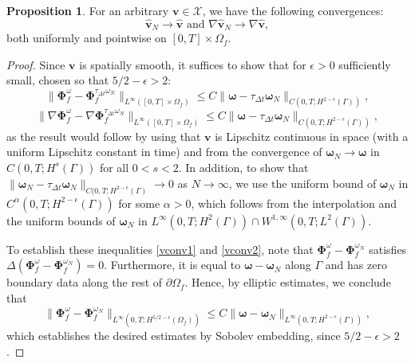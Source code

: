 \documentclass[11pt]{article}
\newcommand{\bd}{\boldsymbol}
\theoremstyle{definition}
\newtheorem{proposition}{Proposition}[section]
\begin{document}
\begin{proposition}\label{testconvergence}
For an arbitrary $\bd{v} \in \mathcal{X}$, we have the following convergences:
\begin{equation*}
\hat{\bd{v}}_{N} \to \hat{\bd{v}} \text{ and } \nabla \hat{\bd{v}}_{N} \to \nabla \hat{\bd{v}},
\end{equation*}
both uniformly and pointwise on $[0, T] \times \Omega_{f}$. 
\end{proposition}

\begin{proof}
Since $\bd{v}$ is spatially smooth, it suffices to show that for $\epsilon > 0$ sufficiently small, chosen so that $5/2 - \epsilon > 2$:
\begin{equation}\label{vconv1}
\|\bd{\Phi}^{\omega}_{f} - \bd{\Phi}^{\tau_{\Delta t}\omega_{N}}_{f}\|_{L^{\infty}([0, T] \times \Omega_{f})} \le C\|\bd{\omega} - \tau_{\Delta t}\bd{\omega}_{N}\|_{C(0, T; H^{2 - \epsilon}(\Gamma))},
\end{equation}
\begin{equation}\label{vconv2}
\|\nabla \bd{\Phi}^{\omega}_{f} - \nabla \bd{\Phi}^{\tau_{\Delta t}\omega_{N}}_{f}\|_{L^{\infty}([0, T] \times \Omega_{f})} \le C\|\bd{\omega} - \tau_{\Delta t}\bd{\omega}_{N}\|_{C(0, T; H^{2 - \epsilon}(\Gamma))},
\end{equation}
as the result would follow by using that $\bd{v}$ is Lipschitz continuous in space (with a uniform Lipschitz constant in time) and from the convergence of $\bd{\omega}_{N} \to \bd{\omega}$ in $C(0, T; H^{s}(\Gamma))$ for all $0 < s < 2$. In addition, to show that $\|\bd{\omega}_{N} - \tau_{\Delta t} \bd{\omega}_{N}\|_{C(0, T; H^{2 - \epsilon}(\Gamma)} \to 0$ as $N \to \infty$, we use the uniform bound of $\bd{\omega}_{N}$ in $C^{\alpha}(0, T; H^{2 - \epsilon}(\Gamma))$ for some $\alpha > 0$, which follows from the interpolation and the uniform bounds of $\bd{\omega}_{N}$ in $L^{\infty}(0, T; H^{2}(\Gamma)) \cap W^{1, \infty}(0, T; L^{2}(\Gamma))$. 

To establish these inequalities \eqref{vconv1} and \eqref{vconv2}, note that $\bd{\Phi}^{\omega}_{f} - \bd{\Phi}^{\omega_{N}}_{f}$ satisfies $\Delta (\bd{\Phi}^{\omega}_{f} - \bd{\Phi}^{\omega_{N}}_{f}) = 0$. Furthermore, it is equal to $\bd{\omega} - \bd{\omega}_{N}$ along $\Gamma$ and has zero boundary data along the rest of $\partial \Omega_{f}$. Hence, by elliptic estimates, we conclude that
\begin{equation*}
\|\bd{\Phi}^{\omega}_{f} - \bd{\Phi}^{\omega_{N}}_{f}\|_{L^{\infty}(0, T; H^{5/2 - \epsilon}(\Omega_{f}))} \le C\|\bd{\omega} - \bd{\omega}_{N}\|_{L^{\infty}(0, T; H^{2 - \epsilon}(\Gamma))},
\end{equation*}
which establishes the desired estimates by Sobolev embedding, since $5/2 - \epsilon > 2$. 
\end{proof}
\end{document}
